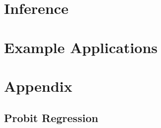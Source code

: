 \section{Inference}
\label{sec:inference}




\section{Example Applications}

\label{sec:example_applications}



\section{Appendix}
%
\subsection{Probit Regression}
\label{sec:probit_review}



